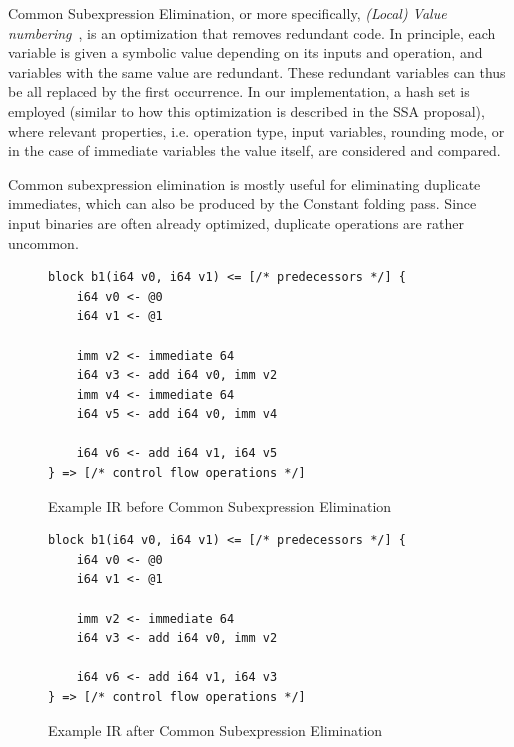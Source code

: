 \documentclass[course=eragp]{aspdoc}
\begin{document}
Common Subexpression Elimination, or more specifically, \textit{(Local) Value
    numbering}~\cite{ssa_proposal}, is an optimization that removes redundant code. In principle, each variable is given a
symbolic value depending on its inputs and operation, and variables with the same value are redundant. These redundant
variables can thus be all replaced by the first occurrence. In our implementation, a hash set is employed (similar to
how this optimization is described in the SSA proposal), where relevant properties, i.e. operation type, input
variables, rounding mode, or in the case of immediate variables the value itself, are considered and compared.

Common subexpression elimination is mostly useful for eliminating duplicate immediates, which can also be produced by
the Constant folding pass. Since input binaries are often already optimized, duplicate operations are rather uncommon.

\begin{figure}[H]
    \centering
    \begin{lstlisting}[]
block b1(i64 v0, i64 v1) <= [/* predecessors */] {
    i64 v0 <- @0
    i64 v1 <- @1

    imm v2 <- immediate 64
    i64 v3 <- add i64 v0, imm v2
    imm v4 <- immediate 64
    i64 v5 <- add i64 v0, imm v4

    i64 v6 <- add i64 v1, i64 v5
} => [/* control flow operations */]
\end{lstlisting}
    \caption{Example IR before Common Subexpression Elimination}\label{fig:cse_example_before}
\end{figure}

\begin{figure}[H]
    \centering
    \begin{lstlisting}[]
block b1(i64 v0, i64 v1) <= [/* predecessors */] {
    i64 v0 <- @0
    i64 v1 <- @1

    imm v2 <- immediate 64
    i64 v3 <- add i64 v0, imm v2

    i64 v6 <- add i64 v1, i64 v3
} => [/* control flow operations */]
\end{lstlisting}
    \caption{Example IR after Common Subexpression Elimination}\label{fig:cse_example_after}
\end{figure}
\end{document}
